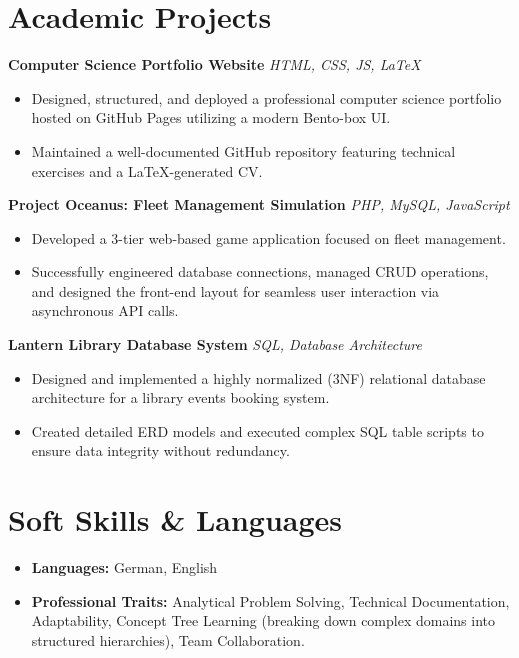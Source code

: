 \documentclass[11pt,a4paper]{article}
\begin{document}
\section*{Academic Projects}

\noindent
\textbf{Computer Science Portfolio Website} \hfill \textit{HTML, CSS, JS, LaTeX}
\begin{itemize}[leftmargin=0.15in, label={--}, itemsep=1pt, topsep=2pt]
    \item Designed, structured, and deployed a professional computer science portfolio hosted on GitHub Pages utilizing a modern Bento-box UI.
    \item Maintained a well-documented GitHub repository featuring technical exercises and a LaTeX-generated CV.
\end{itemize}

\vspace{0.5em}
\noindent
\textbf{Project Oceanus: Fleet Management Simulation} \hfill \textit{PHP, MySQL, JavaScript}
\begin{itemize}[leftmargin=0.15in, label={--}, itemsep=1pt, topsep=2pt]
    \item Developed a 3-tier web-based game application focused on fleet management.
    \item Successfully engineered database connections, managed CRUD operations, and designed the front-end layout for seamless user interaction via asynchronous API calls.
\end{itemize}

\vspace{0.5em}
\noindent
\textbf{Lantern Library Database System} \hfill \textit{SQL, Database Architecture}
\begin{itemize}[leftmargin=0.15in, label={--}, itemsep=1pt, topsep=2pt]
    \item Designed and implemented a highly normalized (3NF) relational database architecture for a library events booking system.
    \item Created detailed ERD models and executed complex SQL table scripts to ensure data integrity without redundancy.
\end{itemize}

\section*{Soft Skills \& Languages}
\begin{itemize}[leftmargin=0.15in, label={--}, itemsep=2pt]
    \item \textbf{Languages:} German, English
    \item \textbf{Professional Traits:} Analytical Problem Solving, Technical Documentation, Adaptability, Concept Tree Learning (breaking down complex domains into structured hierarchies), Team Collaboration.
\end{itemize}
\end{document}
